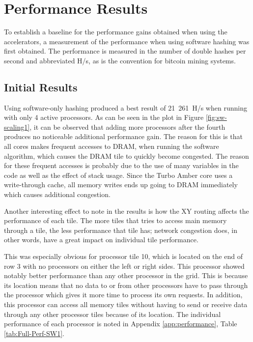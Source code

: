 \section{Performance Results}

To establish a baseline for the performance gains obtained when using the accelerators,
a measurement of the performance when using software hashing was first obtained. The
performance is measured in the number of double hashes per second and abbreviated H/s,
as is the convention for bitcoin mining systems.

\subsection{Initial Results}
\label{sec:init-results}

Using software-only hashing produced a best result of 21~261~H/s when running with only 4 active processors. As can be seen
in the plot in Figure \ref{fig:sw-scaling1}, it can be observed that adding more processors after the fourth produces no
noticeable additional performance gain. The reason for this is that all cores makes frequent
accesses to DRAM, when running the software algorithm, which causes the DRAM tile to quickly
become congested. The reason for these frequent accesses is probably due to the use of
many variables in the code as well as the effect of stack usage. Since the Turbo Amber core
uses a write-through cache, all memory writes ends up going to DRAM immediately which causes
additional congestion.

Another interesting effect to note in the results is how the XY routing affects the performance
of each tile. The more tiles that tries to access main memory through a tile, the less
performance that tile has; network congestion does, in other words, have a great impact on individual
tile performance.

This was especially obvious for processor tile 10, which is located on the end of row 3 with no
processors on either the left or right sides. This processor showed notably better performance than
any other processor in the grid. This is because its location means that no data to or from other processors
have to pass through the processor which gives it more time to process its own requests. In addition,
this processor can access all memory tiles without having to send or receive data through any other
processor tiles because of its location. The individual performance of each processor is noted in
Appendix \ref{app:performance}, Table \ref{tab:Full-Perf-SW1}.

